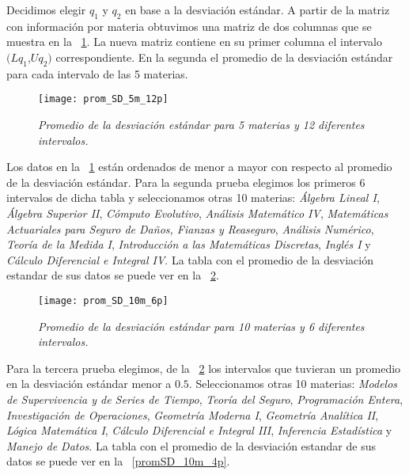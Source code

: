 Decidimos elegir $q_{1}$ y $q_{2}$ en base a la desviación estándar. A partir de la matriz con información por materia obtuvimos una matriz de dos columnas que se muestra en la \figurename{~\ref{promSD_5m_12p}}. La nueva matriz contiene en su primer columna el intervalo $(Lq_{1}$,$Uq_{2})$ correspondiente. En la segunda el promedio de la desviación estándar para cada intervalo de las 5 materias.

\begin{figure}[H]
\centering
\texttt{[image: prom\_SD\_5m\_12p]} %
\caption[\textit{Promedio de la desviación estándar: 5 materias, 12 intervalos}]{\textit{Promedio de la desviación estándar para 5 materias y 12 diferentes intervalos.}}\label{promSD_5m_12p}
\end{figure}


Los datos en la \figurename{~\ref{promSD_5m_12p}} están ordenados de menor a mayor con respecto al promedio de la desviación estándar. Para la segunda prueba elegimos los primeros 6 intervalos de dicha tabla y seleccionamos otras 10 materias: \textit{Álgebra Lineal I}, \textit{Álgebra Superior II}, \textit{Cómputo Evolutivo}, \textit{Análisis Matemático IV}, \textit{Matemáticas Actuariales para Seguro de Daños, Fianzas y Reaseguro}, \textit{Análisis Numérico}, \textit{Teoría de la Medida I}, \textit{Introducción a las Matemáticas Discretas}, \textit{Inglés I} y \textit{Cálculo Diferencial e Integral IV}. La tabla con el promedio de la desviación estandar de sus datos se puede ver en la \figurename{~\ref{promSD_10m_6p}}.


\begin{figure}[H]
\centering
\texttt{[image: prom\_SD\_10m\_6p]} %
\caption[\textit{Promedio de la desviación estándar: 10 materias, 6 intervalos}]{\textit{Promedio de la desviación estándar para 10 materias y 6 diferentes intervalos.}}\label{promSD_10m_6p}
\end{figure}


Para la tercera prueba elegimos, de la \figurename{~\ref{promSD_10m_6p}} los intervalos que tuvieran un promedio en la desviación estándar menor a $0.5$. Seleccionamos otras 10 materias: \textit{Modelos de Supervivencia y de Series de Tiempo}, \textit{Teoría del Seguro}, \textit{Programación Entera}, \textit{Investigación de Operaciones}, \textit{Geometría Moderna I}, \textit{Geometría Analítica II}, \textit{Lógica Matemática I}, \textit{Cálculo Diferencial e Integral III}, \textit{Inferencia Estadística} y \textit{Manejo de Datos}. La tabla con el promedio de la desviación estandar de sus datos se puede ver en la \figurename{~\ref{promSD_10m_4p}}.


